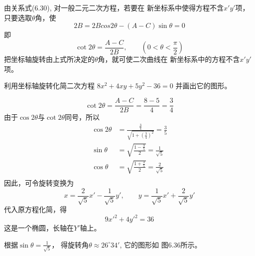 由关系式(6.30), 对一般二元二次方程，若要在
新坐标系中使得方程不含$x'y'$项，只要选取$\theta$角，使
\[2B=2Bcos2\theta -(A-C)\sin\theta=0\]
即
\[\cot 2\theta=\frac{A-C}{2B},\qquad \left(0<\theta<\frac{\pi}{2}\right)\]
把坐标轴旋转由上式所决定的$\theta$角，就可使二次曲线在
新坐标系中的方程不含$x'y'$项。

\begin{example}
    利用坐标轴旋转化简二次方程
$8x^2+4xy+5y^2-36=0$
并画出它的图形。
\end{example}

\begin{solution}
\[\cot 2\theta=\frac{A-C}{2B}=\frac{8-5}{4}=\frac{3}{4}\]
由于$\cos2\theta$与$\cot2\theta$同号，所以
\[\begin{split}
    \cos2\theta&=\frac{\frac{3}{4}}{\sqrt{1+\left(\frac{3}{4}\right)^2}}=\frac{3}{5}\\
    \sin\theta&=\sqrt{\frac{1-\frac{3}{5}}{2}}=\frac{1}{\sqrt{5}}\\
    \cos\theta&=\sqrt{\frac{1+\frac{3}{5}}{2}}=\frac{2}{\sqrt{5}}\\
\end{split}\]
因此，可令旋转变换为
\[x=\frac{2}{\sqrt{5}}x'-\frac{1}{\sqrt{5}}y',\qquad y=\frac{1}{\sqrt{5}}x'+\frac{2}{\sqrt{5}}y'\]
代入原方程化简，得
\[9{x'}^2+4{y'}^2=36\]
这是一个椭圆，长轴在$Y'$轴上。

根据$\sin\theta=\frac{1}{\sqrt{5}}$，
得旋转角$\theta\approx 26^{\circ}34'$, 它的图形如
图6.36所示。
\end{solution}

\begin{figure}[htp]
    \centering
    \caption{}
\end{figure}

